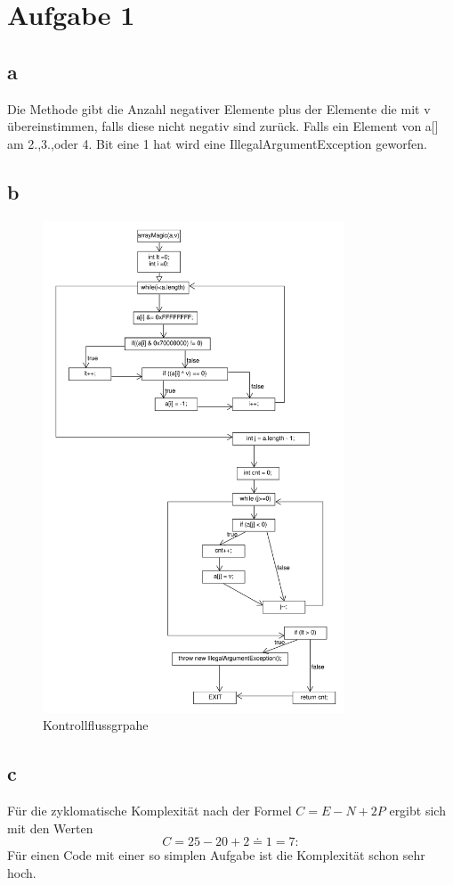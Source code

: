 \chapter*{Aufgabe 1}
\section*{a}
Die Methode gibt die Anzahl negativer Elemente plus der Elemente die mit v übereinstimmen, falls diese nicht negativ sind zurück. Falls ein Element von a[] am 2.,3.,oder 4. Bit eine 1 hat wird eine IllegalArgumentException geworfen.

\section*{b}
\begin{figure}[h]
	\centering
	\includegraphics[width=0.8\textwidth, clip]{FlowChart.pdf}
	\caption{Kontrollflussgrpahe}
	\label{fig:flowChart}
\end{figure}
\section*{c}
Für die zyklomatische Komplexität nach der Formel $ C=E-N+2P$ ergibt sich mit den Werten
\begin{equation}
	C= 25-20+2 \doteq 1 = 7:
\end{equation}
Für einen Code mit einer so simplen Aufgabe ist die Komplexität schon sehr hoch.



